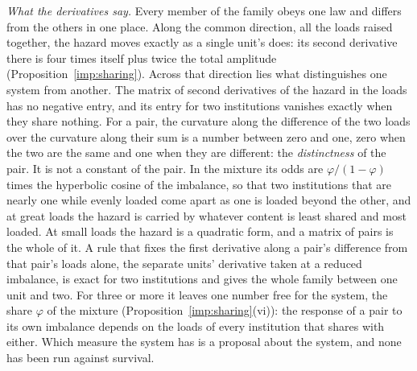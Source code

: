 \emph{What the derivatives say.} Every member of the family obeys one
law and differs from the others in one place. Along the common
direction, all the loads raised together, the hazard moves exactly as a
single unit's does: its second derivative there is four times itself
plus twice the total amplitude (Proposition~\ref{imp:sharing}). Across that direction lies
what distinguishes one system from another. The matrix of second
derivatives of the hazard in the loads has no negative entry, and its
entry for two institutions vanishes exactly when they share nothing. For
a pair, the curvature along the difference of the two loads over the
curvature along their sum is a number between zero and one, zero when the
two are the same and one when they are different: the \emph{distinctness}
of the pair. It is not a constant of the pair. In the mixture its odds
are $\varphi/(1-\varphi)$ times the hyperbolic cosine of the imbalance,
so that two institutions that are nearly one while evenly loaded come
apart as one is loaded beyond the other, and at great loads the hazard is
carried by whatever content is least shared and most loaded. At small
loads the hazard is a quadratic form, and a matrix of pairs is the whole
of it. A rule that fixes the first derivative along a pair's difference
from that pair's loads alone, the separate units' derivative taken at a
reduced imbalance, is exact for two institutions and gives the whole
family between one unit and two. For three or more it leaves one number
free for the system, the share $\varphi$ of the mixture (Proposition~\ref{imp:sharing}(vi)):
the response of a pair to its own imbalance depends on the loads of every
institution that shares with either. Which measure the system has is a
proposal about the system, and none has been run against survival.

